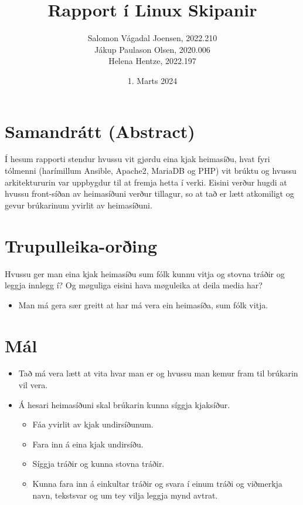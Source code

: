 \documentclass{article}
\title{Rapport í Linux Skipanir}
\author{Salomon Vágadal Joensen, 2022.210\\Jákup Paulason Olsen, 2020.006\\Helena Hentze, 2022.197}
\date{1. Marts 2024}
\begin{document}


\tableofcontents
\newpage

\section{Samandrátt (Abstract)}
\par Í hesum rapporti stendur hvussu vit gjørdu eina kjak heimasíðu, hvat fyri tólmenni
(harímillum Ansible, Apache2, MariaDB og PHP) vit brúktu og hvussu arkitektururin var uppbygdur
til at fremja hetta í verki. Eisini verður hugdi at hvussu front-síðan av heimasíðuni verður tillagur, 
so at tað er lætt atkomiligt og gevur brúkarinum yvirlit av heimasíðuni.

\section{Trupulleika-orðing}
\par Hvussu ger man eina kjak heimasíðu sum fólk kunnu vitja og stovna tráðir og leggja innlegg í? 
Og møguliga eisini hava møguleika at deila media har? 
\begin{itemize}
    \item Man má gera sær greitt at har má vera ein heimasíða, sum fólk vitja.
\end{itemize}

\section{Mál}

\begin{itemize}
    \item Tað má vera lætt at vita hvar man er og hvussu man kemur fram til brúkarin vil vera.
    \item Á hesari heimasíðuni skal brúkarin kunna síggja kjaksíður.
    \begin{itemize}
        \item Fáa yvirlit av kjak undirsíðunum.
        \item Fara inn á eina kjak undirsíðu.
        \item Síggja tráðir og kunna stovna tráðir.
        \item Kunna fara inn á einkultar tráðir og svara í einum tráði og viðmerkja navn, tekstsvar og um tey vilja leggja mynd avtrat. 
    \end{itemize}
\end{itemize} 
\end{document}
